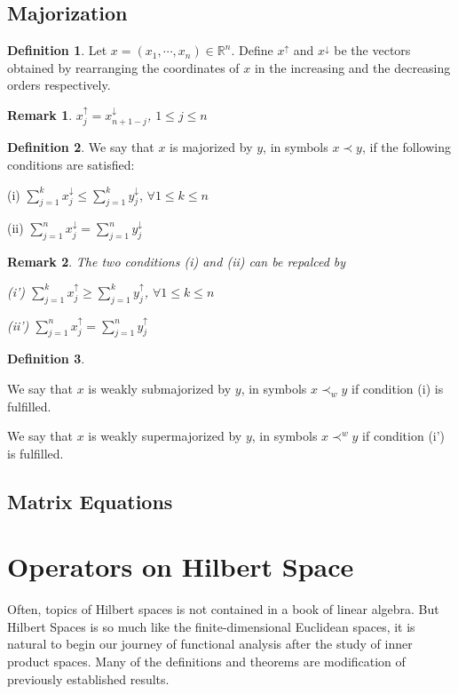 \documentclass{book}
\newtheorem*{remark}{Remark}
\theoremstyle{definition}
\newtheorem{definition}{Definition}[section]
\begin{document}
\section{Majorization}
\begin{definition}
Let $x=(x_1,\cdots,x_n)\in\mathbb{R}^n$. Define $x^\uparrow$ and $x^\downarrow$ be the vectors obtained by rearranging the coordinates of $x$ in the increasing and the decreasing orders respectively.
\end{definition}
\begin{remark}
$x_j^\uparrow=x_{n+1-j}^\downarrow$,    $1\le j\le n$
\end{remark}
\begin{definition}
We say that $x$ is majorized by $y$, in symbols $x\prec y$, if the following conditions are satisfied: \par
(i) $\sum_{j=1}^k x_j^\downarrow \le \sum_{j=1}^k y_j^\downarrow$, $\forall 1\le k \le n$\par
(ii) $\sum_{j=1}^n x_j^\downarrow = \sum_{j=1}^n y_j^\downarrow$
\end{definition}
\begin{remark}
The two conditions (i) and (ii) can be repalced by \par
(i') $\sum_{j=1}^k x_j^\uparrow \ge \sum_{j=1}^k y_j^\uparrow$, $\forall 1\le k \le n$\par
(ii') $\sum_{j=1}^n x_j^\uparrow = \sum_{j=1}^n y_j^\uparrow$
\end{remark}
\begin{definition}
\,\par
We say that $x$ is weakly submajorized by $y$, in symbols $x\prec_w y$ if condition (i) is fulfilled.\par
We say that $x$ is weakly supermajorized by $y$, in symbols $x\prec^w y$ if condition (i') is fulfilled.
\end{definition}


\section{Matrix Equations}\label{Matrix Equations}




\chapter{Operators on Hilbert Space}
Often, topics of Hilbert spaces is not contained in a book of linear algebra. But Hilbert Spaces is so much like the finite-dimensional Euclidean spaces, it is natural to begin our journey of functional analysis after the study of inner product spaces. Many of the definitions and theorems are modification of previously established results. 
\end{document}
